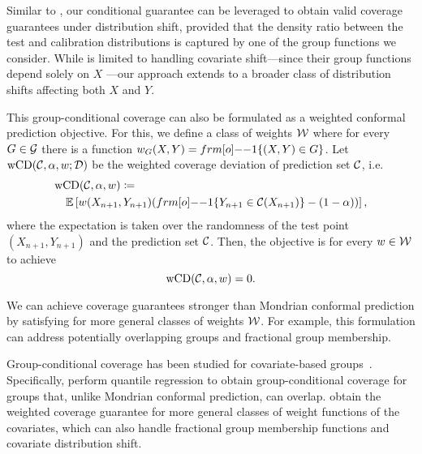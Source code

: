 Similar to \citet{GCC2023}, our conditional guarantee can be leveraged to obtain valid coverage guarantees under distribution shift, provided that the density ratio between the test and calibration distributions is captured by one of the group functions we consider. While \citet{GCC2023} is limited to handling covariate shift—since their group functions depend solely on  $X$ —our approach extends to a broader class of distribution shifts affecting both  $X$  and $Y$. 



\iffalse
This group-conditional coverage can also be formulated as a weighted conformal prediction objective. For this, we define a class of weights ${\cal W}$ where for every $G \in {\cal G}$ there is a function $w_G(X,Y) = \11\{(X,Y) \in G\}$. Let $\text{wCD}({\cal C}, \alpha, w;{\cal D})$ be the weighted coverage deviation of prediction set ${\cal C}$, \mbox{i.e.}
\begin{align*}
    &\wcovdev(\calC, \alpha, w) \coloneqq \\
    &\quad\EE\left[w(X_{n+1},Y_{n+1})(\11\{Y_{n+1} \in \calC(X_{n+1})\}-(1-\alpha))\right],
\end{align*}
where the expectation is taken over the randomness of the test point $(X_{n+1},Y_{n+1})$ and the prediction set ${\cal C}$.
Then, the objective is for every $w \in \cal W$ to achieve
\begin{equation}
\label{eq:weighted_guarantee}
\text{wCD}({\cal C}, \alpha, w)= 0.
\end{equation}

We can achieve coverage guarantees stronger than Mondrian conformal prediction by satisfying  for more general classes of weights ${\cal W}$. For example, this formulation can address potentially overlapping groups and fractional group membership.  


 
Group-conditional coverage has been studied for covariate-based groups~\citep{GCC2023, JNRR2023}. Specifically, \cite{JNRR2023} perform quantile regression to obtain group-conditional coverage for groups that, unlike Mondrian conformal prediction, can overlap. \cite{GCC2023} obtain the weighted coverage guarantee for more general classes of weight functions of the covariates, which can also handle fractional group membership functions and covariate distribution shift.



